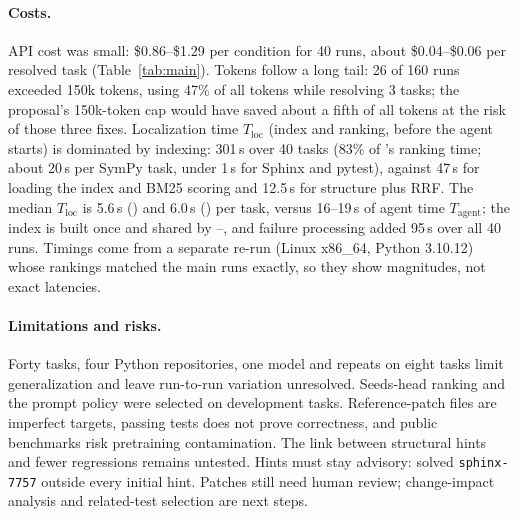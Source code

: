 \paragraph{Costs.}
API cost was small: \$0.86--\$1.29 per condition for 40 runs, about \$0.04--\$0.06 per resolved task
(Table~\ref{tab:main}). Tokens follow a long tail: 26 of 160 runs exceeded 150k tokens, using 47\% of
all tokens while resolving 3 tasks; the proposal's 150k-token cap would have saved about a fifth of all
tokens at the risk of those three fixes. Localization time $T_{\mathrm{loc}}$ (index and ranking, before
the agent starts) is dominated by indexing: 301\,s over 40 tasks (83\% of \condC's ranking time; about
20\,s per SymPy task, under 1\,s for Sphinx and pytest), against 47\,s for loading the index and BM25
scoring and 12.5\,s for structure plus RRF. The median $T_{\mathrm{loc}}$ is 5.6\,s (\condB) and 6.0\,s (\condC) per task, versus 16--19\,s
of agent time $T_{\mathrm{agent}}$; the index is built once and shared by \condB--\condD, and failure
processing added 95\,s over all 40 \condD{} runs. Timings come from a separate re-run (Linux x86\_64,
Python 3.10.12) whose rankings matched the main runs exactly, so they show magnitudes, not exact latencies.

\paragraph{Limitations and risks.}
Forty tasks, four Python repositories, one model and repeats on eight tasks limit
generalization and leave run-to-run variation unresolved. Seeds-head ranking and the prompt
policy were selected on development tasks. Reference-patch files are imperfect targets,
passing tests does not prove correctness, and public benchmarks risk pretraining contamination.
The link between structural hints and fewer regressions remains untested. Hints must stay
advisory: \condC{} solved \texttt{sphinx-7757} outside every initial hint. Patches still need
human review; change-impact analysis and related-test selection are next steps.
